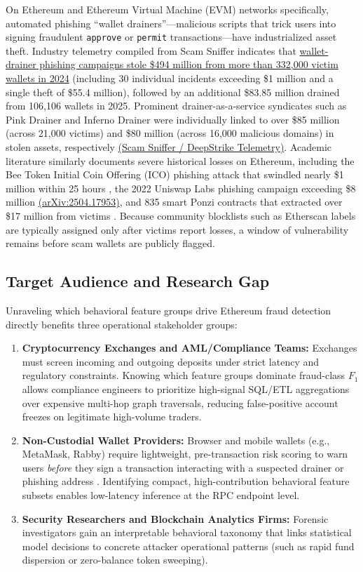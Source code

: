 \documentclass[conference]{IEEEtran}
\begin{document}
On Ethereum and Ethereum Virtual Machine (EVM) networks specifically, automated phishing ``wallet drainers''---malicious scripts that trick users into signing fraudulent \texttt{approve} or \texttt{permit} transactions---have industrialized asset theft. Industry telemetry compiled from Scam Sniffer indicates that \href{https://deepstrike.io/blog/crypto-wallet-drainer-statistics}{wallet-drainer phishing campaigns stole \$494 million from more than 332,000 victim wallets in 2024} (including 30 individual incidents exceeding \$1 million and a single theft of \$55.4 million), followed by an additional \$83.85 million drained from 106,106 wallets in 2025. Prominent drainer-as-a-service syndicates such as Pink Drainer and Inferno Drainer were individually linked to over \$85 million (across 21,000 victims) and \$80 million (across 16,000 malicious domains) in stolen assets, respectively \href{https://deepstrike.io/blog/crypto-wallet-drainer-statistics}{(Scam Sniffer / DeepStrike Telemetry)}. Academic literature similarly documents severe historical losses on Ethereum, including the Bee Token Initial Coin Offering (ICO) phishing attack that swindled nearly \$1 million within 25 hours \cite{wu2020}, the 2022 Uniswap Labs phishing campaign exceeding \$8 million \href{https://arxiv.org/html/2504.17953v1}{(arXiv:2504.17953)}, and 835 smart Ponzi contracts that extracted over \$17 million from victims \cite{chen2021}. Because community blocklists such as Etherscan labels are typically assigned only after victims report losses, a window of vulnerability remains before scam wallets are publicly flagged.

\subsection{Target Audience and Research Gap}
Unraveling which behavioral feature groups drive Ethereum fraud detection directly benefits three operational stakeholder groups:
\begin{enumerate}
    \item \textbf{Cryptocurrency Exchanges and AML/Compliance Teams:} Exchanges must screen incoming and outgoing deposits under strict latency and regulatory constraints. Knowing which feature groups dominate fraud-class $F_1$ allows compliance engineers to prioritize high-signal SQL/ETL aggregations over expensive multi-hop graph traversals, reducing false-positive account freezes on legitimate high-volume traders.
    \item \textbf{Non-Custodial Wallet Providers:} Browser and mobile wallets (e.g., MetaMask, Rabby) require lightweight, pre-transaction risk scoring to warn users \emph{before} they sign a transaction interacting with a suspected drainer or phishing address \cite{chen2020ijcai}. Identifying compact, high-contribution behavioral feature subsets enables low-latency inference at the RPC endpoint level.
    \item \textbf{Security Researchers and Blockchain Analytics Firms:} Forensic investigators gain an interpretable behavioral taxonomy that links statistical model decisions to concrete attacker operational patterns (such as rapid fund dispersion or zero-balance token sweeping).
\end{enumerate}
\end{document}
